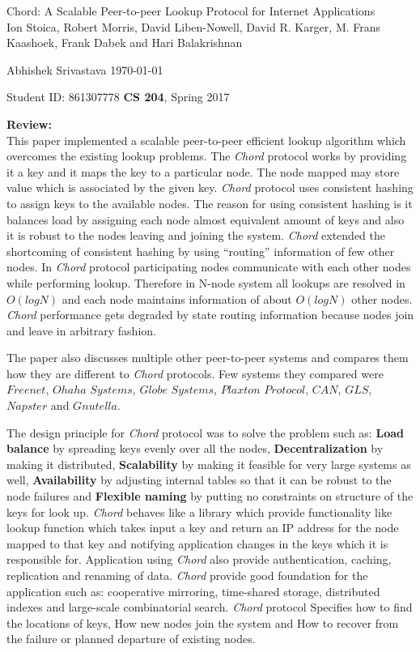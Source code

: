 \documentclass[a4paper,12pt, twoside]{article}
\renewcommand{\maketitle}{%
 	\Large
 	\begin{center}
 	Chord: A Scalable Peer-to-peer Lookup Protocol
 	for Internet Applications\\	
 	\normalsize Ion Stoica, Robert Morris, David Liben-Nowell, David R. Karger, M. Frans Kaashoek, Frank Dabek and Hari Balakrishnan
 	\end{center}
 
 	\Large
	Abhishek Srivastava
	\hfill
	\normalsize
	\today
 	\par
 	Student ID: 861307778
 	\hfill
 	\textbf{CS 204}, Spring 2017
 	\par 	
 	\hrulefill
 	\par
 	}
\begin{document}
\thispagestyle{empty}
	
\maketitle

\textbf{Review:}\\

This paper implemented a scalable peer-to-peer efficient lookup algorithm which overcomes the existing lookup problems. The \emph{Chord} protocol works by providing it a key and it maps the key to a particular node. The node mapped may store value which is associated by the given key. \emph{Chord} protocol uses consistent hashing to assign keys to the available nodes. The reason for using consistent hashing is it balances load by assigning each node almost equivalent amount of keys and also it is robust to the nodes leaving and joining the system. \emph{Chord} extended the shortcoming of consistent hashing by using ``routing'' information of few other nodes. In \emph{Chord} protocol participating nodes communicate with each other nodes while performing lookup. Therefore in N-node system all lookups are resolved in $O(log N)$  and each node maintains information of about $O(log N)$ other nodes. \emph{Chord} performance gets degraded by state routing information because nodes join and leave in arbitrary fashion.

The paper also discusses multiple other  peer-to-peer systems and compares them how they are different to \emph{Chord} protocols. Few systems they compared were $Freenet$, $Ohaha$ $Systems$, $Globe$ $Systems$, $Plaxton$ $Protocol$, $CAN$, $GLS$, $Napster$ and $Gnutella$.

The design principle for \emph{Chord} protocol was to solve the problem such as: \textbf{Load balance} by spreading keys evenly over all the nodes, \textbf{Decentralization} by making it distributed, \textbf{Scalability} by making it feasible for very large systems as well, \textbf{Availability} by adjusting internal tables so that it can be robust to the node failures and \textbf{Flexible naming} by putting no constraints on structure of the keys for look up. \emph{Chord} behaves like a library which provide functionality like lookup function which takes input a key and return an IP address for the node mapped to that key and notifying application changes in the keys which it is responsible for. Application using \emph{Chord} also provide authentication, caching, replication and renaming of data. \emph{Chord} provide good foundation for the application such as: cooperative mirroring, time-shared storage, distributed indexes and large-scale combinatorial search. \emph{Chord} protocol Specifies how to find the locations of keys, How new nodes join the system and How to recover from the failure or planned departure of existing nodes.
\end{document}
